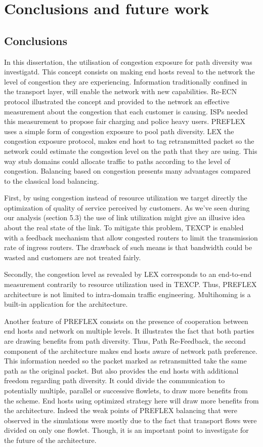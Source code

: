 \chapter{Conclusions and future work}
\label{chap:conclusion}
\section{Conclusions}

In this dissertation, the utilisation of congestion exposure for path diversity was investigatd. This concept consists on making end hosts reveal to the network the level of congestion they are experiencing. Information traditionally confined in the transport layer, will enable the network with new capabilities. Re-ECN protocol illustrated the concept and provided  to the network an effective measurement about the congestion that each customer is causing. ISPs needed this measurement to propose fair charging and police heavy users. PREFLEX uses a simple form of congestion exposure to pool path diversity. LEX the congestion exposure protocol, makes end host to tag retransmitted packet so the network could estimate the congestion level on the path that they are using. This way stub domains could allocate traffic to paths according to the level of congestion. Balancing based on congestion presents many advantages compared to the classical load balancing. 

First, by using congestion instead of resource utilization we target directly the optimization of quality of service perceived by customers. As we've seen during our analysis (section 5.3) the use of link utilization might give an illusive idea about the real state of the link.  To mitigate this problem, TEXCP is enabled with a feedback mechanism that allow congested routers to limit the transmission rate of  ingress routers. The drawback of such means is that bandwidth could be wasted and customers are not treated fairly.

Secondly, the congestion level as revealed by LEX corresponds to an end-to-end measurement contrarily to resource utilization used in TEXCP. Thus, PREFLEX architecture is not limited to intra-domain traffic engineering. Multihoming is a built-in application for the architecture.

Another feature of PREFLEX consists on the presence of cooperation between end hosts and network on multiple levels. It illustrates the fact that both parties are drawing benefits from path diversity. Thus, Path Re-Feedback, the second component of the architecture makes end hosts aware of network path preference. This information needed so the packet marked as retransmitted take the same path as the original packet. But also provides the end hosts with additional freedom regarding path diversity. It could divide the communication to potentially multiple, parallel or successive flowlets, to draw more benefits from the scheme. End hosts using optimized strategy here will draw more benefits from the architecture. Indeed the weak points of PREFLEX balancing that were observed in the simulations were mostly due to the fact that transport flows were divided on only one flowlet. Though, it is an important point to investigate for the future of the architecture.
 
